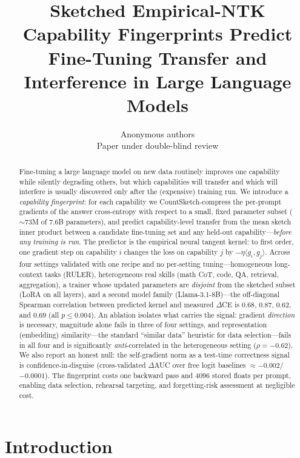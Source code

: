 \documentclass{article} %
\title{Sketched Empirical-NTK Capability Fingerprints Predict\\
Fine-Tuning Transfer and Interference in Large Language Models}
\author{Anonymous authors\\Paper under double-blind review}
\begin{document}
\maketitle

\begin{abstract}
Fine-tuning a large language model on new data routinely improves one capability while
silently degrading others, but which capabilities will transfer and which will interfere
is usually discovered only after the (expensive) training run. We introduce a
\emph{capability fingerprint}: for each capability we CountSketch-compress the per-prompt
gradients of the answer cross-entropy with respect to a small, fixed parameter subset
($\sim$73M of 7.6B parameters), and predict capability-level transfer from the mean sketch
inner product between a candidate fine-tuning set and any held-out capability---\emph{before
any training is run}. The predictor is the empirical neural tangent kernel: to first order,
one gradient step on capability $i$ changes the loss on capability $j$ by
$-\eta\langle g_i, g_j\rangle$. Across four settings validated with one recipe and no
per-setting tuning---homogeneous long-context tasks (RULER), heterogeneous real skills (math
CoT, code, QA, retrieval, aggregation), a trainer whose updated parameters are \emph{disjoint}
from the sketched subset (LoRA on all layers), and a second model family (Llama-3.1-8B)---the
off-diagonal Spearman correlation between predicted kernel and measured $\Delta$CE is
$0.68$, $0.87$, $0.62$, and $0.69$ (all $p \le 0.004$). An ablation isolates what carries the
signal: gradient \emph{direction} is necessary, magnitude alone fails in three of four
settings, and representation (embedding) similarity---the standard ``similar data'' heuristic
for data selection---fails in all four and is significantly \emph{anti}-correlated in the
heterogeneous setting ($\rho=-0.62$). We also report an honest null: the self-gradient norm as
a test-time correctness signal is confidence-in-disguise (cross-validated $\Delta$AUC over
free logit baselines $\approx -0.002$/$-0.0001$). The fingerprint costs one backward pass and
4096 stored floats per prompt, enabling data selection, rehearsal targeting, and forgetting-risk
assessment at negligible cost.
\end{abstract}

\section{Introduction}
\label{sec:intro}
\end{document}
